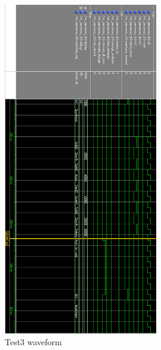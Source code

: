 \begin{figure}
\centering
\includegraphics[width=0.6\textwidth]{img/wavetest3.png}
\caption{Test3 waveform}
\label{fig:test3}
\end{figure}

